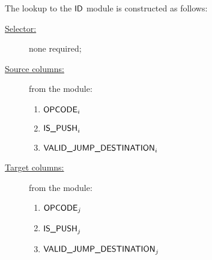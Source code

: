 The lookup to the $\textsf{ID}$ module is constructed as follows:
\begin{description}
	\item[\underline{Selector:}] none required;
	\item[\underline{Source columns:}] from the \romMod{} module:
	\begin{multicols}{3}
	\begin{enumerate}
		\item $\textsf{OPCODE}_{i}$
		\item $\textsf{IS\_PUSH}_{i}$
		\item $\textsf{VALID\_JUMP\_DESTINATION}_{i}$
	\end{enumerate}
	\end{multicols}
\item[\underline{Target columns:}] from the \idMod{} module: 
	\begin{multicols}{3}
	\begin{enumerate}
		\item $\textsf{OPCODE}_{j}$
		\item $\textsf{IS\_PUSH}_{j}$
		\item $\textsf{VALID\_JUMP\_DESTINATION}_{j}$
	\end{enumerate} 
	\end{multicols}
\end{description}
